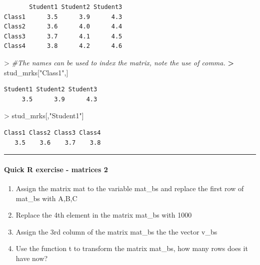 \documentclass[
]{book}
\newenvironment{Shaded}{\begin{snugshade}}{\end{snugshade}}
\newcommand{\CommentTok}[1]{\textcolor[rgb]{0.56,0.35,0.01}{\textit{#1}}}
\newcommand{\ErrorTok}[1]{\textcolor[rgb]{0.64,0.00,0.00}{\textbf{#1}}}
\newcommand{\NormalTok}[1]{#1}
\newcommand{\SpecialCharTok}[1]{\textcolor[rgb]{0.00,0.00,0.00}{#1}}
\newcommand{\StringTok}[1]{\textcolor[rgb]{0.31,0.60,0.02}{#1}}
\theoremstyle{definition}
\theoremstyle{definition}
\theoremstyle{definition}
\theoremstyle{definition}
\theoremstyle{remark}
\begin{document}
\begin{verbatim}
       Student1 Student2 Student3
Class1      3.5      3.9      4.3
Class2      3.6      4.0      4.4
Class3      3.7      4.1      4.5
Class4      3.8      4.2      4.6
\end{verbatim}

\begin{Shaded}
\begin{Highlighting}[]
\SpecialCharTok{\textgreater{}} \CommentTok{\#The names can be used to index the matrix, note the use of comma.}
\ErrorTok{\textgreater{}}\NormalTok{ stud\_mrks[}\StringTok{"Class1"}\NormalTok{,]}
\end{Highlighting}
\end{Shaded}

\begin{verbatim}
Student1 Student2 Student3 
     3.5      3.9      4.3 
\end{verbatim}

\begin{Shaded}
\begin{Highlighting}[]
\SpecialCharTok{\textgreater{}}\NormalTok{ stud\_mrks[,}\StringTok{"Student1"}\NormalTok{]}
\end{Highlighting}
\end{Shaded}

\begin{verbatim}
Class1 Class2 Class3 Class4 
   3.5    3.6    3.7    3.8 
\end{verbatim}

\begin{center}\rule{0.5\linewidth}{0.5pt}\end{center}

\hypertarget{quick-r-exercise---matrices-2}{%
\paragraph*{\texorpdfstring{\textbf{Quick R exercise - matrices 2}}{Quick R exercise - matrices 2}}\label{quick-r-exercise---matrices-2}}

\begin{enumerate}
\def\labelenumi{\arabic{enumi}.}
\item
  Assign the matrix mat to the variable mat\_bs and replace the first row of mat\_bs with A,B,C
\item
  Replace the 4th element in the matrix mat\_bs with 1000
\item
  Assign the 3rd column of the matrix mat\_bs the the vector v\_bs
\item
  Use the function t to transform the matrix mat\_bs, how many rows does it have now?
\end{enumerate}
\end{document}
